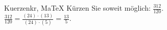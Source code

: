 \begin{MAufgabe}{Kuerzen}{kr, MaTeX}
K\"urzen Sie soweit m\"oglich: $\frac{312}{120}$.\\ 
\ifLsg\MLoesung
\quad $\frac{312}{120}=\frac{(24)\cdot(13)}{(24)\cdot(5)}=\frac{13}{5}$.\else\relax\fi
 \end{MAufgabe}
